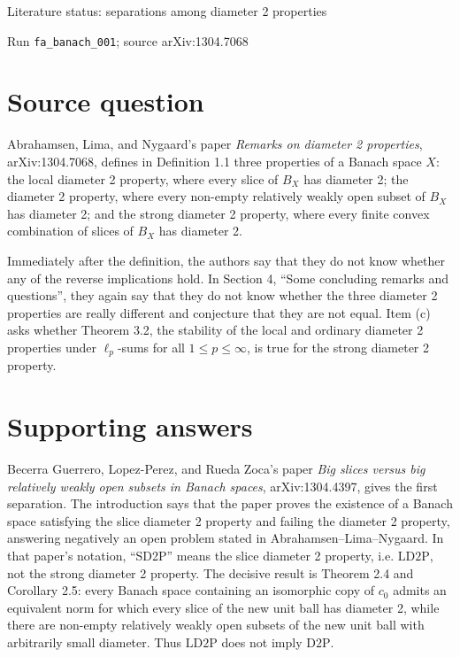 \documentclass[11pt]{article}
\newcommand{\LDTP}{\mathrm{LD2P}}
\newcommand{\DTP}{\mathrm{D2P}}
\newcommand{\cnull}{c_0}
\begin{document}
\begin{center}
{\Large Literature status: separations among diameter 2 properties}

\medskip
{\small Run \texttt{fa\_banach\_001}; source arXiv:1304.7068}
\end{center}

\section*{Source question}

Abrahamsen, Lima, and Nygaard's paper \emph{Remarks on diameter 2 properties},
arXiv:1304.7068, defines in Definition 1.1 three properties of a Banach space
\(X\): the local diameter 2 property, where every slice of \(B_X\) has
diameter 2; the diameter 2 property, where every non-empty relatively weakly
open subset of \(B_X\) has diameter 2; and the strong diameter 2 property,
where every finite convex combination of slices of \(B_X\) has diameter 2.

Immediately after the definition, the authors say that they do not know
whether any of the reverse implications hold. In Section 4, ``Some concluding
remarks and questions'', they again say that they do not know whether the
three diameter 2 properties are really different and conjecture that they are
not equal. Item (c) asks whether Theorem 3.2, the stability of the local and
ordinary diameter 2 properties under \(\ell_p\)-sums for all
\(1\leq p\leq \infty\), is true for the strong diameter 2 property.

\section*{Supporting answers}

Becerra Guerrero, Lopez-Perez, and Rueda Zoca's paper \emph{Big slices versus
big relatively weakly open subsets in Banach spaces}, arXiv:1304.4397, gives
the first separation. The introduction says that the paper proves the
existence of a Banach space satisfying the slice diameter 2 property and
failing the diameter 2 property, answering negatively an open problem stated
in Abrahamsen--Lima--Nygaard. In that paper's notation, ``SD2P'' means the
slice diameter 2 property, i.e. \(\LDTP\), not the strong diameter 2 property.
The decisive result is Theorem 2.4 and Corollary 2.5: every Banach space
containing an isomorphic copy of \(\cnull\) admits an equivalent norm for
which every slice of the new unit ball has diameter 2, while there are
non-empty relatively weakly open subsets of the new unit ball with arbitrarily
small diameter. Thus \(\LDTP\) does not imply \(\DTP\).
\end{document}
